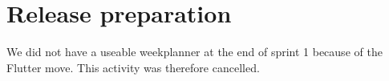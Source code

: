 \section{Release preparation}
We did not have a useable weekplanner at the end of sprint 1 because of the Flutter move. This activity was therefore cancelled.